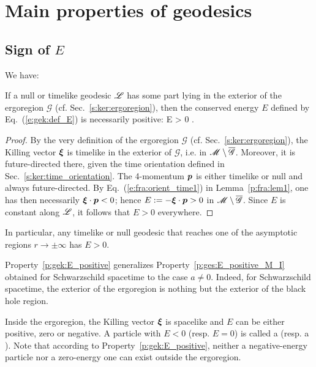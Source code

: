 
\section{Main properties of geodesics} \label{s:ges:general_prop}

\subsection{Sign of $E$} \label{s:gek:sign_E}

We have:
\begin{prop}
\label{p:gek:E_positive}
If a null or timelike geodesic $\mathscr{L}$ has some part lying in the exterior of the ergoregion $\mathscr{G}$ (cf. Sec.~\ref{s:ker:ergoregion}),
then the conserved energy $E$ defined by Eq.~(\ref{e:gek:def_E}) is necessarily
positive:
\be \label{e:gek:E_positive}
    \Li \not\subset {}\quad \Longrightarrow \quad E > 0 .
\ee
\end{prop}
\begin{proof}
By the very definition of the ergoregion $\mathscr{G}$ (cf. Sec.~\ref{s:ker:ergoregion}),
the Killing vector $\bm{\xi}$ is timelike in the exterior of $\mathscr{G}$, i.e.
in $\mathscr{M}\setminus\overline{\mathscr{G}}$. Moreover, it is
future-directed there, given the time orientation defined in Sec.~\ref{s:ker:time_orientation}.
The 4-momentum $\bm{p}$ is either timelike or null and always future-directed.
By Eq.~(\ref{e:fra:orient_time1}) in Lemma~\ref{p:fra:lem1}, one has then necessarily $\bm{\xi}\cdot\bm{p} < 0$; hence
$E := - \bm{\xi}\cdot\bm{p} > 0$ in $\mathscr{M}\setminus \overline{\mathscr{G}}$. Since $E$ is constant along $\mathscr{L}$, it
follows that $E > 0$ everywhere.
\end{proof}
In particular, any timelike or null geodesic that reaches one of the asymptotic regions
$r\to\pm\infty$ has $E>0$.
\begin{remark}
Property~\ref{p:gek:E_positive} generalizes Property~\ref{p:ges:E_positive_M_I}
obtained for Schwarzschild spacetime to
the case $a\not=0$. Indeed, for Schwarzschild spacetime, the exterior of the ergoregion
is nothing but the exterior of the black hole region.
\end{remark}

Inside the ergoregion, the Killing vector $\bm{\xi}$ is spacelike and $E$ can be
either positive, zero or negative.
A particle with $E<0$ (resp. $E=0$) is called a
(resp. a ).
Note that according to Property~\ref{p:gek:E_positive}, neither a negative-energy particle nor a zero-energy one can exist outside the ergoregion.

